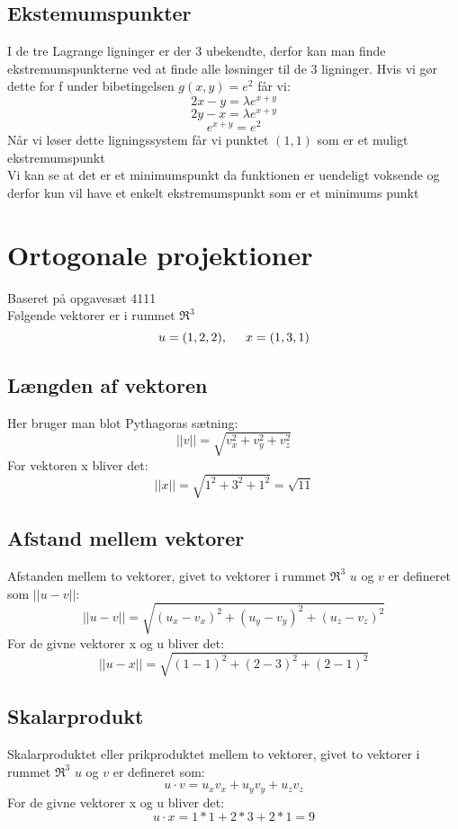 \documentclass{article}
\begin{document}
\subsection{Ekstemumspunkter}
I de tre Lagrange ligninger er der 3 ubekendte, derfor kan man finde 
ekstremumspunkterne ved at finde alle løsninger til de 3 ligninger.
Hvis vi gør dette for f under bibetingelsen $g(x,y)=e^2$ får vi:
$$2x-y=\lambda e^{x+y}$$
$$2y-x=\lambda e^{x+y}$$
$$e^{x+y}=e^2$$
Når vi løser dette ligningssystem får vi punktet $(1,1)$ som er et muligt 
ekstremumspunkt\\[5mm]
Vi kan se at det er et minimumspunkt da funktionen er uendeligt voksende og 
derfor kun vil have et enkelt ekstremumspunkt som er et minimums punkt

\newpage

\section{Ortogonale projektioner}
{\tiny Baseret på opgavesæt 4111}\\
Følgende vektorer er i rummet $\Re^3$
$$u=(1,2,2), \hspace{5mm} x=(1,3,1)$$

\subsection{Længden af vektoren}
Her bruger man blot Pythagoras sætning:
$$||v||=\sqrt{v_x^2+v_y^2+v_z^2}$$
For vektoren x bliver det:
$$||x||=\sqrt{1^2+3^2+1^2}=\sqrt{11}$$

\subsection{Afstand mellem vektorer}
Afstanden mellem to vektorer, givet to vektorer i rummet $\Re^3$ $u$ og $v$ er 
defineret som $||u-v||$:
$$||u-v|| = \sqrt{(u_x-v_x)^2+(u_y-v_y)^2+(u_z-v_z)^2}$$
For de givne vektorer x og u bliver det:
$$||u-x||=\sqrt{(1-1)^2+(2-3)^2+(2-1)^2}$$

\subsection{Skalarprodukt}
Skalarproduktet eller prikproduktet mellem to vektorer, givet to vektorer i 
rummet $\Re^3$ $u$ og $v$ er defineret som:
$$u\cdot v = u_xv_x+u_yv_y+u_zv_z$$
For de givne vektorer x og u bliver det:
$$u\cdot x = 1*1 + 2*3 + 2*1 = 9$$
\end{document}

